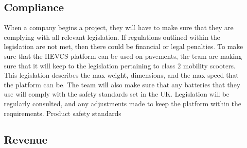 \documentclass [12pt]{article}
\begin{document}
\subsection{Compliance}\label{sec:Compliance_Risk}

When a company begins a project, they will have to make sure that they are complying with all relevant legislation. If regulations outlined within the legislation are not met, then there could be financial or legal penalties. To make sure that the HEVCS platform can be used on pavements, the team are making sure that it will keep to the legislation pertaining to class 2 mobility scooters. This legislation describes the max weight, dimensions, and the max speed that the platform can be. The team will also make sure that any batteries that they use will comply with the safety standards set in the UK. Legislation will be regularly consulted, and any adjustments made to keep the platform within the requirements. Product safety standards

\subsection{Revenue}\label{sec:Revenue_Risk}
\end{document}

